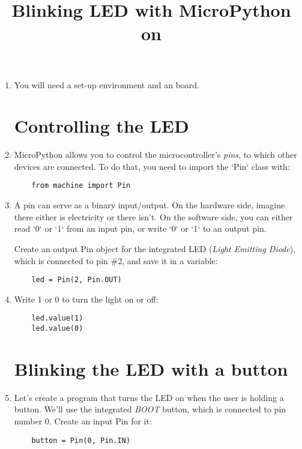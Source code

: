 \documentclass{../tutorial}
\title{Blinking LED with MicroPython on \abbr{ESP32}}
\begin{document}
\begin{enumerate}

\item
    You will need a set-up environment and an \ESP board.

\section{Controlling the LED}

\item
    MicroPython allows you to control the microcontroller's \emph{pins},
    to which other devices are connected.
    To do that, you need to import the `Pin` class with:

    \begin{lstlisting}
    from machine import Pin
    \end{lstlisting}

\item
    A pin can serve as a binary input/output.
    On the hardware side, imagine there either is electricity or there isn't.
    On the software side, you can either read `0` or `1` from an
    input pin, or write `0` or `1` to an output pin.

    Create an output Pin object for the integrated LED (\emph{Light Emitting Diode}),
    which is connected to pin \#2, and save it in a variable:

    \begin{lstlisting}
    led = Pin(2, Pin.OUT)
    \end{lstlisting}

\item
    Write 1 or 0 to turn the light on or off:

    \begin{lstlisting}
    led.value(1)
    led.value(0)
    \end{lstlisting}

\section{Blinking the LED with a button}

\item
    Let's create a program that turns the LED on when the user is holding a button.
    We'll use the integrated \emph{BOOT} button, which is connected to pin number 0.
    Create an input Pin for it:

    \begin{lstlisting}
    button = Pin(0, Pin.IN)
    \end{lstlisting}


\end{enumerate}
\end{document}
